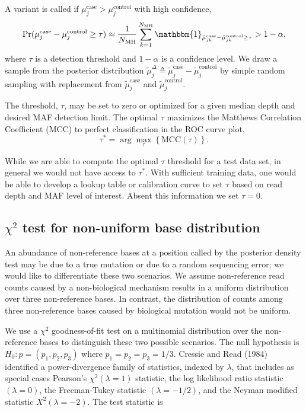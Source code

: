\documentclass{bioinfo}
\begin{document}
A variant is called if $\mu_j^{\text{case}} > \mu_j^{\text{control}}$ with high confidence,
\begin{equation}\label{eqn:bayes_test}
	\Pr( \mu_j^{\text{case}} - \mu_j^{\text{control}}  \geq \tau ) \approx \frac{1}{N_{\text{MH}}} \sum_{k=1}^{N_{\text{MH}}} \mathbbm{1}_{\tilde{\mu}_{jk}^{\text{case}} - \tilde{\mu}_{jk}^{\text{control}} \geq \tau } > 1-\alpha,
\end{equation}
where $\tau$ is a detection threshold and $1-\alpha$ is a confidence level. We draw a sample from the posterior distribution $\tilde{\mu}_j^{\Delta} \triangleq \tilde{\mu}_j^{\text{case}} - \tilde{\mu}_j^{\text{control}}$ by simple random sampling with replacement from $\tilde{\mu}_j^{\text{case}}$ and $\tilde{\mu}_j^{\text{control}}$.

The threshold, $\tau$, may be set to zero or optimized for a given median depth and desired MAF detection limit. The optimal $\tau$ maximizes the Matthews Correlation Coefficient (MCC) to perfect classification in the ROC curve plot,
\begin{equation}
	\tau^* = \arg\max_\tau \left\{ \text{MCC}(\tau)\right\}.
\end{equation}

While we are able to compute the optimal $\tau$ threshold for a test data set, in general we would not have access to $\tau^*$. With sufficient training data, one would be able to develop a lookup table or calibration curve to set $\tau$ based on read depth and MAF level of interest. Absent this information we set $\tau = 0$.


\subsection{$\chi^2$ test for non-uniform base distribution}

An abundance of non-reference bases at a position called by the posterior density test may be due to a true mutation or due to a random sequencing error; we would like to differentiate these two scenarios. We assume non-reference read counts caused by a non-biological mechanism results in a uniform distribution over three non-reference bases. In contrast, the distribution of counts among three non-reference bases caused by biological mutation would not be uniform.

We use a $\chi^2$ goodness-of-fit test on a multinomial distribution over the non-reference bases to distinguish these two possible scenarios. The null hypothesis is $H_0: p = (p_1, p_2, p_3)$ where $p_1=p_2=p_3=1/3$. Cressie and Read (1984) identified a power-divergence family of statistics, indexed by $\lambda$, that includes as special cases Pearson's $\chi^2 (\lambda = 1)$ statistic, the log likelihood ratio statistic $(\lambda = 0)$, the Freeman-Tukey statistic $(\lambda = -1/2)$, and the Neyman modified statistic $X^2 (\lambda = -2)$. The test statistic is
\end{document}
